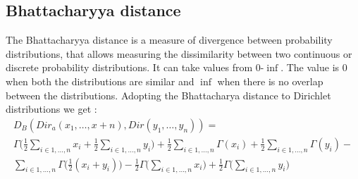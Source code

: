 \begin{appendices}
	
\chapter{Bhattacharyya distance}
	 The Bhattacharyya distance\cite{bhattachayya1943measure} is a measure of divergence between
probability distributions, that allows measuring the dissimilarity between two continuous or discrete probability distributions. It can take values from 0-$\inf$. The value is 0 when both the distributions are similar and $\inf$ when there is no overlap between the distributions. Adopting the  Bhattacharya distance to Dirichlet distributions \cite{rauber2008bhattacharyya} we get :
\begin{multline}
	D_B(Dir_a(x_1, \dots ,x+n), Dir(y_1, \dots , y_n)) = \nonumber\\
	 \Gamma \Bigg( \frac{1}{2}  \sum_{i \in {1, \dots, n}} x_i +  \frac{1}{2}\sum_{i \in {1, \dots, n}} y_i\Bigg) + 
	\frac{1}{2}  \sum_{i \in {1, \dots, n}} \Gamma (x_i) + 
	\frac{1}{2}  \sum_{i \in {1, \dots, n}} \Gamma (y_i) - \\ 
	\sum_{i \in {1, \dots, n}} \Gamma \bigg(\frac{1}{2} (x_i + y_i) \bigg) - \frac{1}{2}  \Gamma \Bigg(  \sum_{i \in {1, \dots, n}} x_i \Bigg) + \frac{1}{2}  \Gamma \Bigg( \sum_{i \in {1, \dots, n}} y_i\Bigg)
\end{multline}


\end{appendices} 


